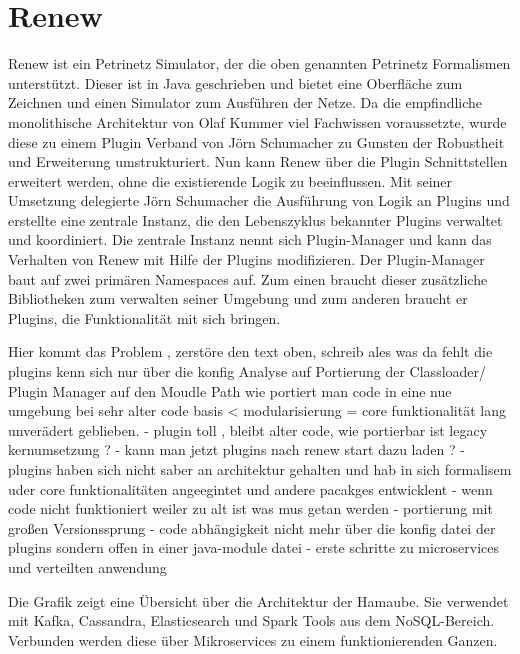 \section{Renew} 
Renew ist ein Petrinetz Simulator, der die oben genannten Petrinetz Formalismen unterstützt. Dieser ist in Java geschrieben und bietet eine Oberfläche zum Zeichnen und einen Simulator zum Ausführen der Netze. \newline 
Da die empfindliche monolithische Architektur von Olaf Kummer viel Fachwissen voraussetzte, wurde diese zu einem Plugin Verband von Jörn Schumacher zu Gunsten der Robustheit und Erweiterung umstrukturiert. Nun kann Renew über die Plugin Schnittstellen erweitert werden, ohne die existierende Logik zu beeinflussen. \bigbreak
Mit seiner Umsetzung delegierte Jörn Schumacher die Ausführung von Logik an Plugins und erstellte eine zentrale Instanz, die den Lebenszyklus bekannter Plugins verwaltet und koordiniert. Die zentrale Instanz nennt sich Plugin-Manager und kann das Verhalten von Renew mit Hilfe der Plugins modifizieren.
Der Plugin-Manager baut auf zwei primären Namespaces auf. Zum einen braucht dieser zusätzliche Bibliotheken zum verwalten seiner Umgebung und zum anderen braucht er Plugins, die Funktionalität mit sich bringen. 
\bigbreak 

Hier kommt das Problem , zerstöre den text oben, schreib ales was da fehlt 
die plugins kenn sich  nur über die konfig 
Analyse auf Portierung der Classloader/ Plugin Manager auf den Moudle Path 
wie portiert man code in eine nue umgebung bei sehr alter code basis < modularisierung = core funktionalität lang unverädert geblieben.
- plugin toll , bleibt alter code, wie portierbar ist legacy  kernumsetzung ?
- kann man jetzt plugins nach renew start  dazu laden ?
- plugins haben sich nicht saber an  architektur gehalten und hab in sich formalisem uder core funktionalitäten angeegintet  und andere pacakges entwicklent 
- wenn code nicht funktioniert weiler zu alt ist was mus getan werden 
- portierung  mit großen Versionssprung 
- code abhängigkeit nicht mehr über die konfig datei der plugins sondern offen in einer java-module datei
- erste schritte zu microservices und verteilten anwendung 





Die Grafik zeigt eine Übersicht über die Architektur der Hamaube. Sie
verwendet mit Kafka, Cassandra, Elasticsearch und Spark Tools aus dem
NoSQL-Bereich. Verbunden werden diese über Mikroservices zu einem
funktionierenden Ganzen.


